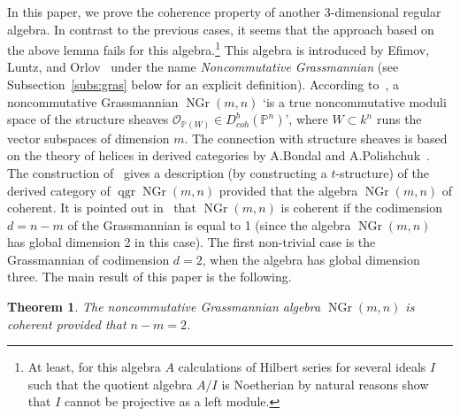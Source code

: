 \documentclass{amsart}
\numberwithin{equation}{section}
\theoremstyle{plain}
\newtheorem{theorem}{Theorem}[section]
\theoremstyle{definition}
\begin{document}
In this paper, we prove the coherence property of another 3-dimensional regular algebra. In contrast to the previous cases, 
it seems  that the approach based on the above lemma fails for this algebra.\footnote{At least,  for this algebra $A$ calculations of Hilbert series for several ideals $I$ such that the quotient algebra $A/I$ is Noetherian  by natural reasons 
show that $I$ cannot be projective as a left module.}  
This algebra is introduced by Efimov, Luntz, and Orlov~\cite{elo} under the name {\em Noncommutative Grassmannian} (see Subsection~\ref{subs:gras} below for an explicit definition).  According to~\cite[Section~7]{elo}, a noncommutative Grassmannian ${\mathop{\mathrm{NGr}}\nolimits}(m,n)$ 
`is a true noncommutative moduli space of the structure sheaves ${\mathcal O_{{\ensuremath{\mathbb P}} (W)} \in D^b_{coh}({\ensuremath{\mathbb P}}^n)}$', where $W \subset k^n$ runs the vector subspaces of dimension $m$. The connection with structure sheaves is based on the theory of helices in derived categories by A.Bondal and A.Polishchuk~\cite{bondal, bp}. The construction of~\cite{elo} gives a description (by constructing a $t$-structure) of the derived category of ${\mathop{\mathrm{qgr}}\nolimits} {\mathop{\mathrm{NGr}}\nolimits}(m,n)$ provided that the algebra ${\mathop{\mathrm{NGr}}\nolimits}(m,n)$  of coherent.  It is pointed out in~\cite[Remark~8.23]{elo} 
that ${\mathop{\mathrm{NGr}}\nolimits}(m,n)$ is coherent if the codimension $d = n-m$ of the Grassmannian is equal to 1 (since the algebra ${\mathop{\mathrm{NGr}}\nolimits}(m,n)$ has global dimension 2 in this case). The first non-trivial case is the Grassmannian of codimension $d= 2$, when the algebra has global dimension three. The main result of this paper is the following.

\begin{theorem}
\label{th:main_intro}
The noncommutative Grassmannian algebra ${\mathop{\mathrm{NGr}}\nolimits}(m,n)$ is coherent provided that $n-m=2$.
\end{theorem}
\end{document}
